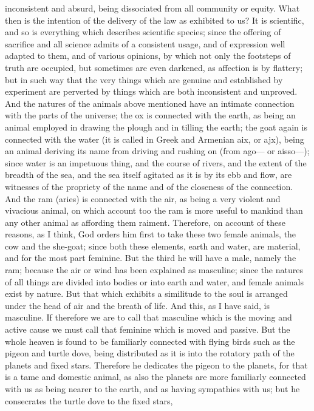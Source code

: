 inconsistent and absurd, being dissociated from all community or equity. What then is the intention
of the delivery of the law as exhibited to us? It is scientific, and so is everything which describes
scientific species; since the offering of sacrifice and all science admits of a consistent usage, and
of expression well adapted to them, and of various opinions, by which not only the footsteps of truth
are occupied, but sometimes are even darkened, as affection is by flattery; but in such way that
the very things which are genuine and established by experiment are perverted by things which are
both inconsistent and unproved. And the natures of the animals above mentioned have an intimate
connection with the parts of the universe; the ox is connected with the earth, as being an animal
employed in drawing the plough and in tilling the earth; the goat again is connected with the water (it
is called in Greek and Armenian aix, or ajx), being an animal deriving its name from driving and
rushing on (from ago— or aisso—); since water is an impetuous thing, and the course of rivers, and
the extent of the breadth of the sea, and the sea itself agitated as it is by its ebb and flow, are
witnesses of the propriety of the name and of the closeness of the connection. And the ram (aries)
is connected with the air, as being a very violent and vivacious animal, on which account too the
ram is more useful to mankind than any other animal as affording them raiment. Therefore, on
account of these reasons, as I think, God orders him first to take these two female animals, the
cow and the she-goat; since both these elements, earth and water, are material, and for the most
part feminine. But the third he will have a male, namely the ram; because the air or wind has been
explained as masculine; since the natures of all things are divided into bodies or into earth and
water, and female animals exist by nature. But that which exhibits a similitude to the soul is
arranged under the head of air and the breath of life. And this, as I have said, is masculine. If
therefore we are to call that masculine which is the moving and active cause we must call that
feminine which is moved and passive. But the whole heaven is found to be familiarly connected
with flying birds such as the pigeon and turtle dove, being distributed as it is into the rotatory path of
the planets and fixed stars. Therefore he dedicates the pigeon to the planets, for that is a tame
and domestic animal, as also the planets are more familiarly connected with us as being nearer to
the earth, and as having sympathies with us; but he consecrates the turtle dove to the fixed stars,

